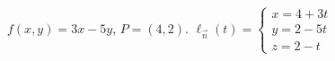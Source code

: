 {$f(x,y) = 3x-5y$,   $P=(4,2)$.
}
{
$\ell_{\vec n}(t) = \left\{\begin{array}{l} x = 4+3t\\ y = 2-5t \\ z = 2 -t \end{array} \right.$ 
}